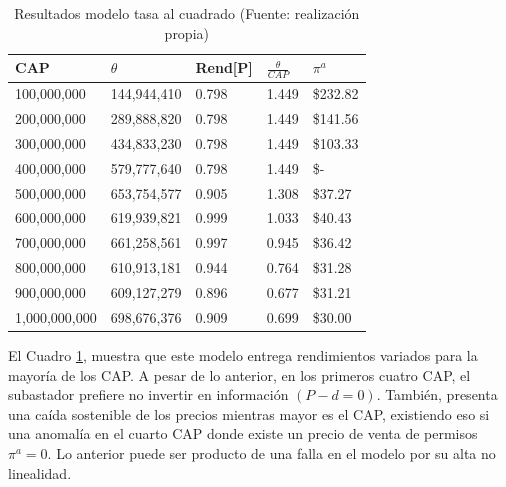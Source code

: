 \begin{table}[H]
    \centering
    \begin{tabular}{|l|l|l|l|l|}
    \hline
        CAP & $\theta$ & Rend[P] & $\frac{\theta}{CAP}$  & $\pi^a$  \\ \hline
        100,000,000 & 144,944,410  & 0.798  & 1.449  &  \$232.82   \\ \hline
        200,000,000 & 289,888,820  & 0.798  & 1.449  &  \$141.56   \\ \hline
        300,000,000 & 434,833,230  & 0.798  & 1.449  &  \$103.33   \\ \hline
        400,000,000 & 579,777,640  & 0.798  & 1.449  &  \$-   \\ \hline
        500,000,000 & 653,754,577  & 0.905  & 1.308  &  \$37.27   \\ \hline
        600,000,000 & 619,939,821  & 0.999  & 1.033  &  \$40.43   \\ \hline
        700,000,000 & 661,258,561  & 0.997  & 0.945  &  \$36.42   \\ \hline
        800,000,000 & 610,913,181  & 0.944  & 0.764  &  \$31.28   \\ \hline
        900,000,000 & 609,127,279  & 0.896  & 0.677  &  \$31.21   \\ \hline
        1,000,000,000 & 698,676,376  & 0.909  & 0.699  &  \$30.00   \\ \hline
    \end{tabular}
    \caption{{\footnotesize Resultados modelo tasa al cuadrado (Fuente: realización propia)}}
    \label{resultadostasacuadrada}
\end{table}

El Cuadro \ref{resultadostasacuadrada}, muestra que este modelo entrega rendimientos variados para la mayoría de los CAP. A pesar de lo anterior, en los primeros cuatro CAP, el subastador prefiere no invertir en información $(P-d=0)$. También, presenta una caída sostenible de los precios mientras mayor es el CAP, existiendo eso si una anomalía en el cuarto CAP donde existe un precio de venta de permisos $\pi^a=0$. Lo anterior puede ser producto de una falla en el modelo por su alta no linealidad.
\vspace{2.5mm}

